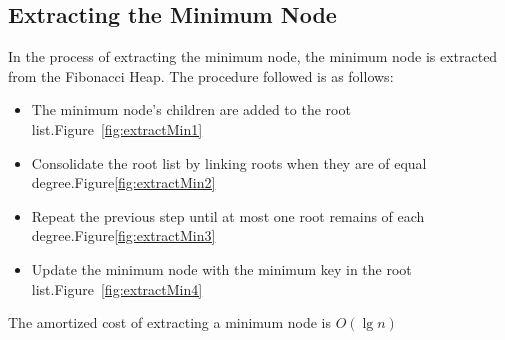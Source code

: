 \subsection{Extracting the Minimum Node}
In the process of extracting the minimum node, the minimum node is extracted from the Fibonacci Heap. The procedure followed is as follows:
\begin{itemize}
	\item The minimum node's children are added to the root list.Figure~\ref{fig:extractMin1}
	\item Consolidate the root list by linking roots when they are of equal degree.Figure\ref{fig:extractMin2}
	\item Repeat the previous step until at most one root remains of each degree.Figure\ref{fig:extractMin3}
	\item Update the minimum node with the minimum key in the root list.Figure~\ref{fig:extractMin4}
\end{itemize}
The amortized cost of extracting a minimum node is $O(\lg{n})$

